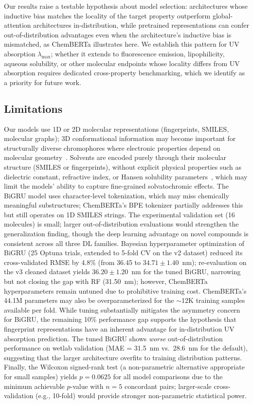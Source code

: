 \documentclass[journal=jcisd8,manuscript=article]{achemso}
\begin{document}
Our results raise a testable hypothesis about model selection: architectures whose inductive bias matches the locality of the target property outperform global-attention architectures in-distribution, while pretrained representations can confer out-of-distribution advantages even when the architecture's inductive bias is mismatched, as ChemBERTa illustrates here. We establish this pattern for UV absorption $\lambda_{\max}$; whether it extends to fluorescence emission, lipophilicity, aqueous solubility, or other molecular endpoints whose locality differs from UV absorption requires dedicated cross-property benchmarking, which we identify as a priority for future work.

\subsection*{Limitations}
Our models use 1D or 2D molecular representations (fingerprints, SMILES, molecular graphs); 3D conformational information may become important for structurally diverse chromophores where electronic properties depend on molecular geometry~\cite{lupopasini2023excited}.
Solvents are encoded purely through their molecular structure (SMILES or fingerprints), without explicit physical properties such as dielectric constant, refractive index, or Hansen solubility parameters~\cite{reichardt2011solvents}, which may limit the models' ability to capture fine-grained solvatochromic effects.
The BiGRU model uses character-level tokenization, which may miss chemically meaningful substructures; ChemBERTa's BPE tokenizer partially addresses this but still operates on 1D SMILES strings.
The experimental validation set (16 molecules) is small; larger out-of-distribution evaluations would strengthen the generalization finding, though the deep learning advantage on novel compounds is consistent across all three DL families.
Bayesian hyperparameter optimization of BiGRU (25 Optuna trials, extended to 5-fold CV on the v2 dataset) reduced its cross-validated RMSE by 4.8\% (from 36.45 to $34.71 \pm 1.40$~nm); re-evaluation on the v3 cleaned dataset yields $36.20 \pm 1.20$~nm for the tuned BiGRU, narrowing but not closing the gap with RF (31.50~nm); however, ChemBERTa hyperparameters remain untuned due to prohibitive training cost.
ChemBERTa's 44.1M parameters may also be overparameterized for the $\sim$12K training samples available per fold.
While tuning substantially mitigates the asymmetry concern for BiGRU, the remaining 10\% performance gap supports the hypothesis that fingerprint representations have an inherent advantage for in-distribution UV absorption prediction.
The tuned BiGRU shows \textit{worse} out-of-distribution performance on wetlab validation (MAE = 31.5~nm vs.\ 28.6~nm for the default), suggesting that the larger architecture overfits to training distribution patterns.
Finally, the Wilcoxon signed-rank test (a non-parametric alternative appropriate for small samples) yields $p = 0.0625$ for all model comparisons due to the minimum achievable $p$-value with $n = 5$ concordant pairs; larger-scale cross-validation (e.g., 10-fold) would provide stronger non-parametric statistical power.
\end{document}

